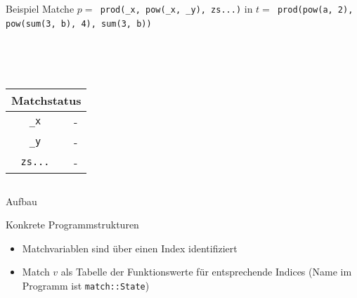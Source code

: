 \documentclass{beamer}
\begin{document}
\begin{frame}[fragile]{Beispiel}
	Matche $p =$\verb~ prod(_x, pow(_x, _y), zs...)~ in 
	$t =$\verb~ prod(pow(a, 2), pow(sum(3, b), 4), sum(3, b))~
	~\\
	\begin{columns}[c] %
		\scriptsize
        \begin{column}{0.3\textwidth}	
			~\\~\\
			\begin{tabular} {c|c}
			\multicolumn{2}{c}{Matchstatus}\\
			\hline
			\verb~_x~      & -            \\
			\verb~_y~      & -            \\
			\verb~zs...~   & -            
			\end{tabular}
        \end{column}
		
        \begin{column}{0.3\textwidth}	
        \end{column}
	\end{columns}
\end{frame}


\begin{frame}[fragile]{Aufbau}


	Konkrete Programmstrukturen
	\begin{itemize}
		\item{Matchvariablen sind über einen Index identifiziert}
		\item{Match $v$ als Tabelle der Funktionswerte für entsprechende Indices (Name im Programm ist \verb~match::State~)}
	\end{itemize}
\end{frame}


\end{document}
